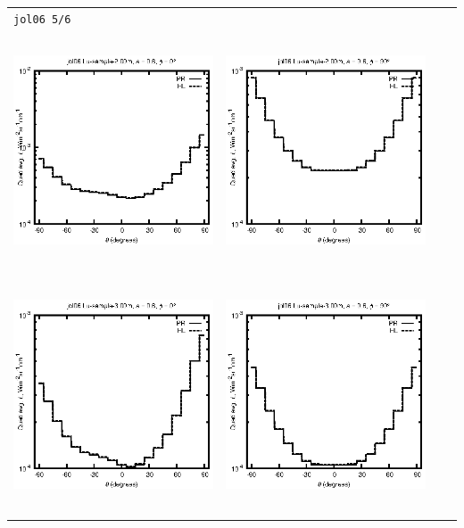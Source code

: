 \begin{tabular}{c c c c}
\multicolumn{4}{l}{\texttt{jol06 5/6}} \\
\includegraphics[height=7cm]{../eps/jol06_Lu_sample_2.00m_fwd.eps} &
\includegraphics[height=7cm]{../eps/jol06_Lu_sample_2.00m_cross.eps} \\
\includegraphics[height=7cm]{../eps/jol06_Lu_sample_3.00m_fwd.eps} &
\includegraphics[height=7cm]{../eps/jol06_Lu_sample_3.00m_cross.eps} \\

\end{tabular}
